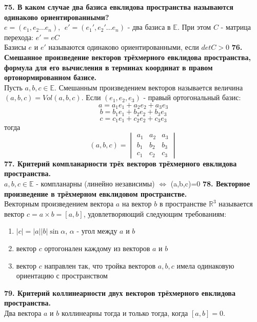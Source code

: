 \documentclass{article}
\begin{document}
\newline
\newline
\textbf{75. В каком случае два базиса евклидова пространства называются одинаково ориентированными?}\\
$e=(e_1,e_2...e_n),~~e'=(e_1',e_2'...e_n)$ - два базиса в $\mathbb{E}$. При этом $C$ - матрица перехода: $e'=eC$\\
Базисы $e$ и $e'$ называются одинаково ориентированными, если $detC>0$
\newline
\newline
\textbf{76. Смешанное произведение векторов трёхмерного евклидова пространства, формула для его вычисления в терминах координат в правом ортонормированном базисе.}\\
Пусть $a,b,c \in \mathbb{E}$. Смешанным произведением векторов называется величина $(a,b,c)=Vol(a,b,c)$. Если $(e_1,e_2,e_3)$ - правый ортогональный базис:
$$a = a_1e_1+a_2e_2+a_3e_3$$
$$b = b_1e_1+b_2e_2+b_3e_3$$
$$c = c_1e_1+c_2e_2+c_3e_3$$
тогда $$(a,b,c)=
\begin{vmatrix}
a_1 & a_2 & a_3\\
b_1 & b_2 & b_3\\
c_1 & c_2 & c_3
\end{vmatrix}$$
\newline
\newline
\textbf{77. Критерий компланарности трёх векторов трёхмерного евклидова пространства.}\\
$a,b,c \in \mathbb{E}$ - компланарны (линейно независимы) $\Leftrightarrow$ (a,b,c)=0
\newline
\newline
\textbf{78. Векторное произведение в трёхмерном евклидовом пространстве.}\\
   Векторным произведением вектора $a$ на вектор $b$ в пространстве $\mathbb{R}^3$ называется вектор $c = a \times b = [a, b]$, удовлетворяющий следующим требованиям:
   \begin{enumerate}
       \item $|c| = |a||b|\sin \alpha$, $\alpha$ - угол между $a$ и $b$
       \item вектор $c$ ортогонален каждому из векторов $a$ и $b$
       \item вектор $c$ направлен так, что тройка векторов $a, b, c$ имела одинаковую ориентацию с пространством
   \end{enumerate}
\noindent
\textbf{79. Критерий коллинеарности двух векторов трёхмерного евклидова пространства.}\\
   Два вектора $a$ и $b$ коллинеарны тогда и только тогда, когда $[a, b] = 0$.
\end{document}
